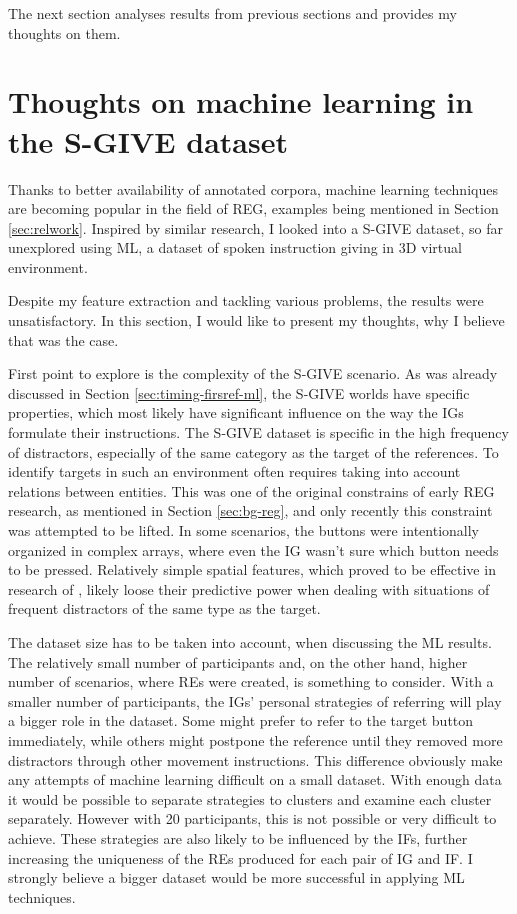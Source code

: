The next section analyses results from previous sections and provides my thoughts on them.

\section{Thoughts on machine learning in the S-GIVE dataset}
Thanks to better availability of annotated corpora, machine learning techniques are becoming popular in the field of REG, examples being mentioned in Section \ref{sec:relwork}. Inspired by similar research, I looked into a S-GIVE dataset, so far unexplored using ML, a dataset of spoken instruction giving in 3D virtual environment.

Despite my feature extraction and tackling various problems, the results were unsatisfactory. In this section, I would like to present my thoughts, why I believe that was the case.

First point to explore is the complexity of the S-GIVE scenario. As was already discussed in Section \ref{sec:timing-firsref-ml}, the S-GIVE worlds have specific properties, which most likely have significant influence on the way the IGs formulate their instructions. The S-GIVE dataset is specific in the high frequency of distractors, especially of the same category as the target of the references. To identify targets in such an environment often requires taking into account relations between entities. This was one of the original constrains of early REG research, as mentioned in Section \ref{sec:bg-reg}, and only recently this constraint was attempted to be lifted. In some scenarios, the buttons were intentionally organized in complex arrays, where even the IG wasn't sure which button needs to be pressed. Relatively simple spatial features, which proved to be effective in research of \citet{stoia2006sentence}, likely loose their predictive power when dealing with situations of frequent distractors of the same type as the target.

The dataset size has to be taken into account, when discussing the ML results. The relatively small number of participants and, on the other hand, higher number of scenarios, where REs were created, is something to consider. With a smaller number of participants, the IGs' personal strategies of referring will play a bigger role in the dataset. Some might prefer to refer to the target button immediately, while others might postpone the reference until they removed more distractors through other movement instructions. This difference obviously make any attempts of machine learning difficult on a small dataset. With enough data it would be possible to separate strategies to clusters and examine each cluster separately. However with 20 participants, this is not possible or very difficult to achieve. These strategies are also likely to be influenced by the IFs, further increasing the uniqueness of the REs produced for each pair of IG and IF. I strongly believe a bigger dataset would be more successful in applying ML techniques.

